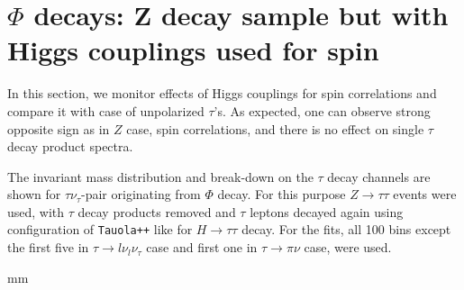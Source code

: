 
\newpage
\section{$\Phi$ decays: Z decay sample but with Higgs couplings used for  spin }\label{sec:OutputH} 
 
In this section, we monitor effects of Higgs couplings for spin correlations
and compare it with case of unpolarized $\tau$'s.
As expected, one can observe strong opposite sign as in $Z$ case, 
spin correlations, and there is  no effect on single $\tau$ decay product spectra.

\setcounter{figure}{0}

The invariant mass distribution and break-down on the $\tau$ decay channels are shown
for $\tau \nu_\tau$-pair originating from $\Phi$ decay.
For this purpose $Z \to \tau \tau$ events were used, with $\tau$ decay products removed 
and $\tau$ leptons decayed again using configuration of {\tt Tauola++} like for $H \to \tau \tau$ decay.
For the fits,  all 100 bins except 
the first five in $\tau \to l \nu_l \nu_\tau $ case  and first one in $\tau \to \pi \nu$ case,  were used.



 mm

\begin{figure}[h!]
\centering 
{} \\
\end{figure}

